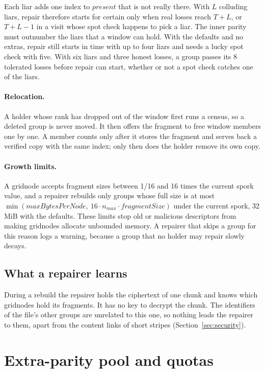 \documentclass[10pt,a4paper,final]{article}
\begin{document}
Each liar adds one index to $\mathit{present}$ that is not really there. With $L$ colluding liars, repair therefore
starts for certain only when real losses reach $T + L$, or $T + L - 1$ in a visit whose spot check happens to pick
a liar. The inner parity must outnumber the liars that a window can hold. With the defaults and no extras, repair
still starts in time with up to four liars and needs a lucky spot check with five. With six liars and three honest
losses, a group passes its 8 tolerated losses before repair can start, whether or not a spot check catches one of
the liars.

\paragraph{Relocation.} A holder whose rank has dropped out of the window first runs a census, so a deleted group is
never moved. It then offers the fragment to free window members one by one. A member counts only after it stores the
fragment and serves back a verified copy with the same index; only then does the holder remove its own copy.

\paragraph{Growth limits.} A gridnode accepts fragment sizes between 1/16 and 16 times the current spork value, and a
repairer rebuilds only groups whose full size is at most $\min(\mathit{maxBytesPerNode},\ 16 \cdot n_{max} \cdot
\mathit{fragmentSize})$ under the current spork, 32\,MiB with the defaults. These limits stop old or malicious
descriptors from making gridnodes allocate unbounded memory. A repairer that skips a group for this reason logs a
warning, because a group that no holder may repair slowly decays.

\subsection{What a repairer learns}

During a rebuild the repairer holds the ciphertext of one chunk and knows which gridnodes hold its fragments. It has
no key to decrypt the chunk. The identifiers of the file's other groups are unrelated to this one, so nothing leads
the repairer to them, apart from the content links of short stripes (Section~\ref{sec:security}).

\section{Extra-parity pool and quotas}
\label{sec:quotas}
\end{document}
